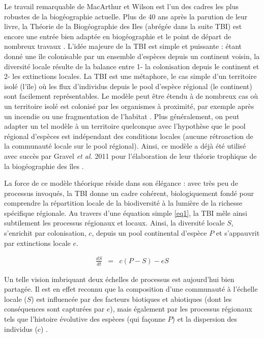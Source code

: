Le travail remarquable de MacArthur et Wilson \cite{MacArthur1967} est
l'un des cadres les plus robustes de la biogéographie actuelle. Plus de
40 ans après la parution de leur livre, la Théorie de la Biogéographie
des Iles (abrégée dans la suite TBI) est encore une entrée bien adaptée
en biogéographie et le point de départ de nombreux travaux
\cite{Gravel2011b,Ryberg2007,Rosindell2011}. L'idée majeure de la TBI
est simple et puissante : étant donné une île colonisable par un
ensemble d'espèces depuis un continent voisin, la diversité locale
résulte de la balance entre 1- la colonisation depuis le continent et 2-
les extinctions locales. La TBI est une métaphore, le cas simple d'un
territoire isolé (l'île) où les flux d'individus depuis le pool d'espèce
régional (le continent) sont facilement représentables. Le modèle peut
être étendu à de nombreux cas où un territoire isolé est colonisé par
les organismes à proximité, par exemple après un incendie ou une
fragmentation de l'habitat \cite{Cook2002}. Plus généralement, on peut
adapter un tel modèle à un territoire quelconque avec l'hypothèse que le
pool régional d'espèces est indépendant des conditions locales (aucune
rétroaction de la communauté locale sur le pool régional). Ainsi, ce
modèle a déjà été utilisé avec succès par Gravel \textit{et al.} 2011
pour l'élaboration de leur théorie trophique de la biogéographie des
îles \cite{Gravel2011b}.

La force de ce modèle théorique réside dans son élégance : avec très peu
de processus invoqués, la TBI donne un cadre cohérent, biologiquement
fondé pour comprendre la répartition locale de la biodiversité à la
lumière de la richesse spécifique régionale. Au travers d'une équation
simple \eqref{eq1}, la TBI mêle ainsi subtilement les processus
régionaux et locaux. Ainsi, la diversité locale \(S\), s'enrichit par
colonisation, \(c\), depuis un pool continental d'espèce \(P\) et
s'appauvrit par extinctions locale \(e\).

\begin{eqnarray}
\label{eq1} \frac{dS}{dt}&=&c(P-S)-eS
\end{eqnarray}

Un telle vision imbriquant deux échelles de processus est aujourd'hui
bien partagée. Il est en effet reconnu que la composition d'une
communauté à l'échelle locale (\(S\)) est influencée par des facteurs
biotiques et abiotiques (dont les conséquences sont capturées par
\(e\)), mais également par les processus régionaux tels que l'histoire
évolutive des espèces (qui façonne \(P\)) et la dispersion des individus
(\(c\)) \cite{Ricklefs1987,Leibold2004}.


